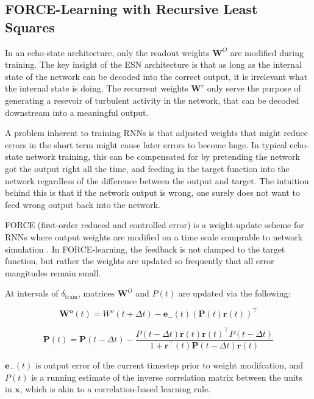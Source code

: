 \documentclass{article} %
\newcommand{\bf}[1]{\mathbf{#1}}
\newcommand{\x}{\bf{x}}
\begin{document}
\subsection{FORCE-Learning with Recursive Least Squares}

In an echo-state architecture, only the readout weights $\bf{W}^O$ are modified during training. The key insight of the ESN architecture is that as long as the internal state of the network can be decoded into the correct output, it is irrelevant what the internal state is doing. The recurrent weights $\bf{W}^r$ only serve the purpose of generating a resevoir of turbulent activity in the network, that can be decoded downstream into a meaningful output.

A problem inherent to training RNNs is that adjusted weights that might reduce errors in the short term might cause later errors to become huge.
In typical echo-state network training, this can be compensated for by pretending the network got the output right all the time, and feeding in the target function into the network regardless of the difference between the output and target. The intuition behind this is that if the network output is wrong, one surely does not want to feed wrong output back into the network.

FORCE (first-order reduced and controlled error) is a weight-update scheme for RNNs where output weights are modified on a time scale comprable to network simulation \cite{Sussillo2009544}. In FORCE-learning, the feedback is not clamped to the target function, but rather the weights are updated so frequently that all error mangitudes remain small.

At intervals of $\delta_{\text{train}}$, matrices $\bf{W}^O$ and $P(t)$ are updated via the following:

\begin{equation} \label{eq:FORCE1}
\bf{W^o}(t) = W^o{(t+\Delta t)} - \bf{e}_{-}(t)(\bf{P}(t)\bf{r}(t))^\intercal
\end{equation}

\begin{equation}
\bf{P}(t) = \bf{P}(t-\Delta t) - \frac{P(t-\Delta t)\bf{r}(t)\bf{r}(t)^{\intercal}P(t-\Delta t)}{1+\bf{r}^{\intercal}(t)\bf{P}(t-\Delta t)\bf{r}(t)}
\end{equation}

$\bf{e}_{-}(t)$ is output error of the current timestep prior to weight modifcation, and $P(t)$ is a running estimate of the inverse correlation matrix between the units in $\x$, which is akin to a correlation-based learning rule.
\end{document}
